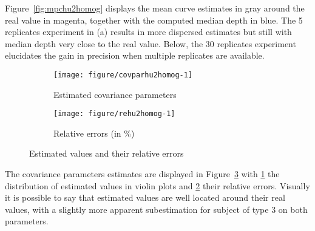 Figure~\ref{fig:mpchu2homog} displays the mean curve estimates in gray around the real value in magenta, together with the computed median depth in blue. The 5 replicates experiment in (a) results in more dispersed estimates but still with median depth very close to the real value. Below, the 30 replicates experiment elucidates the gain in precision when  multiple replicates are available.




\begin{figure}[t]
  \begin{subfigure}{\textwidth}
  \centering
\begin{knitrout}
\color{fgcolor}
\texttt{[image: figure/covparhu2homog-1]} 

\end{knitrout}
    \caption{Estimated covariance parameters} \label{fig:cpest-hu2homog}
  \end{subfigure}
  \begin{subfigure}{\textwidth}
  \centering
\begin{knitrout}
\color{fgcolor}
\texttt{[image: figure/rehu2homog-1]} 

\end{knitrout}
    \caption{Relative errors (in \%) }\label{fig:re-hu2homog}
  \end{subfigure}
  \caption{Estimated values and their relative errors}
  \label{fig:cp-hu2homog}
\end{figure}  

The covariance parameters estimates are displayed in Figure~\ref{fig:cp-hu2homog} with \ref{fig:cpest-hu2homog} the distribution of estimated values in violin plots and \ref{fig:re-hu2homog} their relative errors. Visually it is possible to say that estimated values are well located around their real values, with a slightly more apparent subestimation for subject of type 3 on both parameters.


